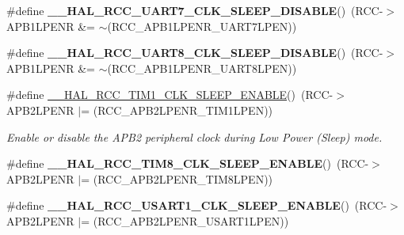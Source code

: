 \begin{DoxyCompactItemize}
\item 
\mbox{\label{group___r_c_c_ex___peripheral___clock___sleep___enable___disable_gaee0e23b484918cc87d4f7f902b737dae}} 
\#define {\bfseries \+\_\+\+\_\+\+H\+A\+L\+\_\+\+R\+C\+C\+\_\+\+U\+A\+R\+T7\+\_\+\+C\+L\+K\+\_\+\+S\+L\+E\+E\+P\+\_\+\+D\+I\+S\+A\+B\+LE}()~(R\+CC-\/$>$A\+P\+B1\+L\+P\+E\+NR \&= $\sim$(R\+C\+C\+\_\+\+A\+P\+B1\+L\+P\+E\+N\+R\+\_\+\+U\+A\+R\+T7\+L\+P\+EN))
\item 
\mbox{\label{group___r_c_c_ex___peripheral___clock___sleep___enable___disable_ga10a9bf8a3752536b50ebda7a812b63f6}} 
\#define {\bfseries \+\_\+\+\_\+\+H\+A\+L\+\_\+\+R\+C\+C\+\_\+\+U\+A\+R\+T8\+\_\+\+C\+L\+K\+\_\+\+S\+L\+E\+E\+P\+\_\+\+D\+I\+S\+A\+B\+LE}()~(R\+CC-\/$>$A\+P\+B1\+L\+P\+E\+NR \&= $\sim$(R\+C\+C\+\_\+\+A\+P\+B1\+L\+P\+E\+N\+R\+\_\+\+U\+A\+R\+T8\+L\+P\+EN))
\item 
\#define \mbox{\hyperlink{group___r_c_c_ex___peripheral___clock___sleep___enable___disable_ga6ce02f1b2689c664010bebc2363d1db4}{\+\_\+\+\_\+\+H\+A\+L\+\_\+\+R\+C\+C\+\_\+\+T\+I\+M1\+\_\+\+C\+L\+K\+\_\+\+S\+L\+E\+E\+P\+\_\+\+E\+N\+A\+B\+LE}}()~(R\+CC-\/$>$A\+P\+B2\+L\+P\+E\+NR $\vert$= (R\+C\+C\+\_\+\+A\+P\+B2\+L\+P\+E\+N\+R\+\_\+\+T\+I\+M1\+L\+P\+EN))
\begin{DoxyCompactList}\small\item\em Enable or disable the A\+P\+B2 peripheral clock during Low Power (Sleep) mode. \end{DoxyCompactList}\item 
\mbox{\label{group___r_c_c_ex___peripheral___clock___sleep___enable___disable_ga0b7b3e090b53ddcf951239d450c5d23e}} 
\#define {\bfseries \+\_\+\+\_\+\+H\+A\+L\+\_\+\+R\+C\+C\+\_\+\+T\+I\+M8\+\_\+\+C\+L\+K\+\_\+\+S\+L\+E\+E\+P\+\_\+\+E\+N\+A\+B\+LE}()~(R\+CC-\/$>$A\+P\+B2\+L\+P\+E\+NR $\vert$= (R\+C\+C\+\_\+\+A\+P\+B2\+L\+P\+E\+N\+R\+\_\+\+T\+I\+M8\+L\+P\+EN))
\item 
\mbox{\label{group___r_c_c_ex___peripheral___clock___sleep___enable___disable_ga454514918be60a95069da332eb212712}} 
\#define {\bfseries \+\_\+\+\_\+\+H\+A\+L\+\_\+\+R\+C\+C\+\_\+\+U\+S\+A\+R\+T1\+\_\+\+C\+L\+K\+\_\+\+S\+L\+E\+E\+P\+\_\+\+E\+N\+A\+B\+LE}()~(R\+CC-\/$>$A\+P\+B2\+L\+P\+E\+NR $\vert$= (R\+C\+C\+\_\+\+A\+P\+B2\+L\+P\+E\+N\+R\+\_\+\+U\+S\+A\+R\+T1\+L\+P\+EN))

\end{DoxyCompactItemize}
